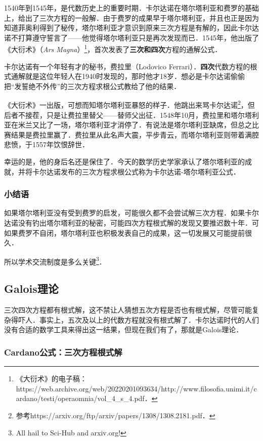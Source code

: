 1540年到1545年，是代数历史上的重要时期．卡尔达诺在塔尔塔利亚和费罗的基础上，给出了三次方程的一般解．由于费罗的成果早于塔尔塔利亚，并且也正是因为知道菲奥利得到了秘传，塔尔塔利亚才意识到原来三次方程是有解的，因此卡尔达诺不打算遵守誓言了——他觉得塔尔塔利亚只是再次发现而已．1545年，他出版了《大衍术》（\textsl{Ars Magna}）\footnote{《大衍术》的电子稿：https://web.archive.org/web/20220201093634/http://www.filosofia.unimi.it/cardano/testi/operaomnia/vol_4_s_4.pdf．}，首次发表了\textbf{三次和四次}方程的通解公式．

卡尔达诺有一个年轻有才的秘书，费拉里（Lodovico Ferrari）．\textbf{四次}代数方程的根式通解就是这位年轻人在1940时发现的，那时他才18岁．想必是卡尔达诺偷偷把“发誓绝不外传”的三次方程求根公式教给了他的结果．

《大衍术》一出版，可想而知塔尔塔利亚暴怒的样子．他跳出来骂卡尔达诺\footnote{参考https://arxiv.org/ftp/arxiv/papers/1308/1308.2181.pdf．}，但后者不接茬，只是让费拉里替父——替师父出征．1548年10月，费拉里和塔尔塔利亚在米兰又比了一场，塔尔塔利亚才消停了．有说法是塔尔塔利亚缺席，但总之比赛结果是费拉里赢了．费拉里从此名声大震，平步青云，而塔尔塔利亚则带着满腔悲愤，于1557年饮恨辞世．

幸运的是，他的身后名还是保住了．今天的数学历史学家承认了塔尔塔利亚的成就，并将卡尔达诺发布的三次方程求根公式称为卡尔达诺-塔尔塔利亚公式．

\subsubsection{小结语}

如果塔尔塔利亚没有受到费罗的启发，可能很久都不会尝试解三次方程．如果卡尔达诺没有钓出塔尔塔利亚的秘密，可能四次方程根式解的发现又要推迟数十年．可如果费罗不自闭，塔尔塔利亚也积极发表自己的成果，这一切发展又可能提前很久．

所以学术交流制度是多么关键\footnote{All hail to Sci-Hub and arxiv.org! }．



\subsection{Galois理论}\label{PlyRtS_sub1}

三次四次方程都有根式解，这不禁让人猜想五次方程是否也有根式解，尽管可能复杂得吓人．事实上，五次及以上的代数方程就没有根式解了．卡尔达诺时代的人们没有合适的数学工具来得出这一结果，但现在我们有了，那就是Galois理论．


\subsubsection{Cardano公式：三次方程根式解}


